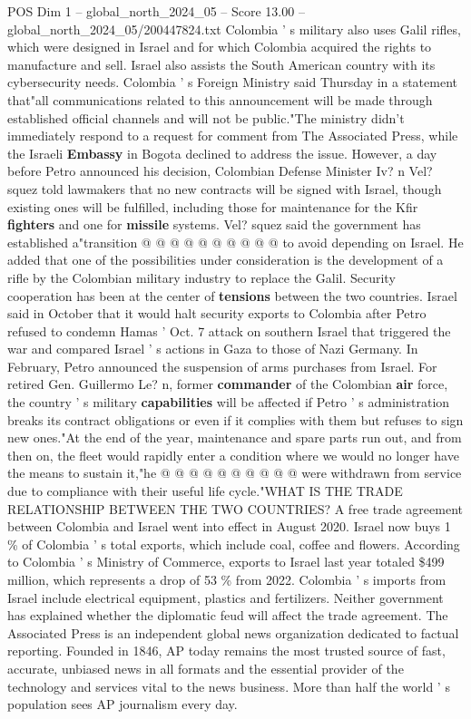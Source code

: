 \begin{textsample}{POS Dim 1 – global\_north\_2024\_05 – Score 13.00 – global\_north\_2024\_05/200447824.txt}
Colombia ' s military also uses Galil rifles, which were designed in Israel and for which Colombia acquired the rights to manufacture and sell.
Israel also assists the South American country with its cybersecurity needs.
Colombia ' s Foreign Ministry said Thursday in a statement that"all communications related to this announcement will be made through established official channels and will not be public."The ministry didn't immediately respond to a request for comment from The Associated Press, while the Israeli \textbf{Embassy} in Bogota declined to address the issue.
However, a day before Petro announced his decision, Colombian Defense Minister Iv? n Vel? squez told lawmakers that no new contracts will be signed with Israel, though existing ones will be fulfilled, including those for maintenance for the Kfir \textbf{fighters} and one for \textbf{missile} systems.
Vel? squez said the government has established a"transition @ @ @ @ @ @ @ @ @ @ to avoid depending on Israel.
He added that one of the possibilities under consideration is the development of a rifle by the Colombian military industry to replace the Galil.
Security cooperation has been at the center of \textbf{tensions} between the two countries.
Israel said in October that it would halt security exports to Colombia after Petro refused to condemn Hamas ' Oct. 7 attack on southern Israel that triggered the war and compared Israel ' s actions in Gaza to those of Nazi Germany.
In February, Petro announced the suspension of arms purchases from Israel.
For retired Gen.
Guillermo Le? n, former \textbf{commander} of the Colombian \textbf{air} force, the country ' s military \textbf{capabilities} will be affected if Petro ' s administration breaks its contract obligations or even if it complies with them but refuses to sign new ones."At the end of the year, maintenance and spare parts run out, and from then on, the fleet would rapidly enter a condition where we would no longer have the means to sustain it,"he @ @ @ @ @ @ @ @ @ @ were withdrawn from service due to compliance with their useful life cycle."WHAT IS THE TRADE RELATIONSHIP BETWEEN THE TWO COUNTRIES?
A free trade agreement between Colombia and Israel went into effect in August 2020.
Israel now buys 1 \% of Colombia ' s total exports, which include coal, coffee and flowers.
According to Colombia ' s Ministry of Commerce, exports to Israel last year totaled \$499 million, which represents a drop of 53 \% from 2022.
Colombia ' s imports from Israel include electrical equipment, plastics and fertilizers.
Neither government has explained whether the diplomatic feud will affect the trade agreement.
The Associated Press is an independent global news organization dedicated to factual reporting.
Founded in 1846, AP today remains the most trusted source of fast, accurate, unbiased news in all formats and the essential provider of the technology and services vital to the news business.
More than half the world ' s population sees AP journalism every day.

\end{textsample}
